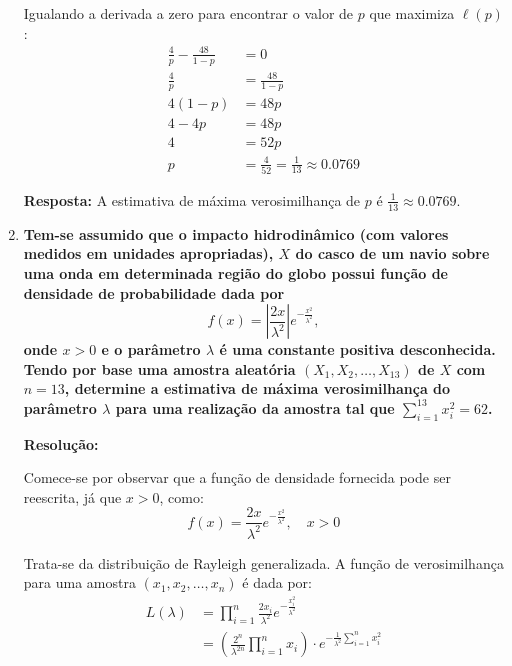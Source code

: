 \documentclass[a4paper,12pt]{article}
\begin{document}
\begin{enumerate}
\begin{mdframed}[backgroundcolor=gray!10, linewidth=0pt, innertopmargin=10pt, innerbottommargin=10pt]
    Igualando a derivada a zero para encontrar o valor de $p$ que maximiza $\ell(p)$:
    \begin{align*}
    \frac{4}{p} - \frac{48}{1-p} &= 0 \\
    \frac{4}{p} &= \frac{48}{1-p} \\
    4(1-p) &= 48p \\
    4 - 4p &= 48p \\
    4 &= 52p \\
    p &= \frac{4}{52} = \frac{1}{13} \approx 0.0769
    \end{align*}

    \textbf{Resposta:} A estimativa de máxima verosimilhança de $p$ é $\frac{1}{13} \approx 0.0769$.
    \end{mdframed}

    \vspace{0.5cm}

    \item \textbf{Tem-se assumido que o impacto hidrodinâmico (com valores medidos em unidades apropriadas), \( X \) do casco de um navio sobre uma onda em determinada região do globo possui função de densidade de probabilidade dada por}
    \[
    f(x) = \left| \frac{2x}{\lambda^2} \right| e^{-\frac{x^2}{\lambda^2}},
    \]
    \textbf{onde \( x > 0 \) e o parâmetro \( \lambda \) é uma constante positiva desconhecida. Tendo por base uma amostra aleatória \( (X_1, X_2, \ldots, X_{13}) \) de \( X \) com \( n = 13 \), determine a estimativa de máxima verosimilhança do parâmetro \( \lambda \) para uma realização da amostra tal que \( \sum_{i=1}^{13} x_i^2 = 62 \).}

    \vspace{0.3cm}

    \begin{mdframed}[backgroundcolor=gray!10, linewidth=0pt, innertopmargin=10pt, innerbottommargin=10pt]
    \textbf{Resolução:}

    Comece-se por observar que a função de densidade fornecida pode ser reescrita, já que \( x > 0 \), como:
    \[
    f(x) = \frac{2x}{\lambda^2} e^{-\frac{x^2}{\lambda^2}}, \quad x > 0
    \]

    Trata-se da distribuição de Rayleigh generalizada. A função de verosimilhança para uma amostra \( (x_1, x_2, \ldots, x_n) \) é dada por:
    \begin{align*}
    L(\lambda) &= \prod_{i=1}^n \frac{2x_i}{\lambda^2} e^{-\frac{x_i^2}{\lambda^2}} \\
    &= \left( \frac{2^n}{\lambda^{2n}} \prod_{i=1}^n x_i \right) \cdot e^{-\frac{1}{\lambda^2} \sum_{i=1}^n x_i^2}
    \end{align*}


\end{mdframed}
\end{enumerate}
\end{document}
